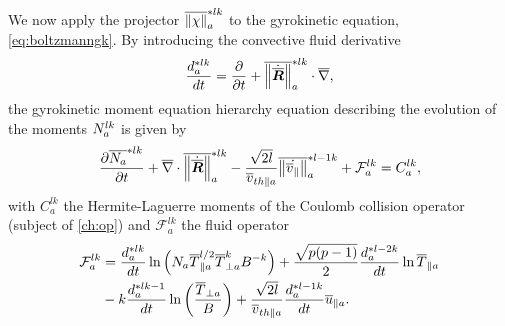 We now apply the projector ${\overline{\left\lVert\chi\right\rVert}^{*lk}_a}$ to the gyrokinetic equation, \cref{eq:boltzmanngk}.
By introducing the convective fluid derivative 
%
\begin{equation} \label{convectivederivative}
\frac{d_a^{*lk}}{d t} = \frac{\partial }{\partial t} + \overline{\left\lVert\dot {\overline{\bm{R}}}\right\rVert}^{*lk}_a \cdot \overline{\nabla},
\end{equation}
%
the gyrokinetic moment equation hierarchy equation describing the evolution of the moments $N_a^{lk}$ is given by
%
\begin{equation} \label{GyromomentHierarchyEquation}  
\frac{\partial \overline {N_a}^{*lk} }{\partial t }  + \overline{\nabla} \cdot \overline{\left\lVert\dot {\overline{\bm{R}}}\right\rVert}^{*lk}_a  - \frac{\sqrt{2l}}{ \overline{v}_{th\parallel a }}\overline{\left\lVert\dot {\overline{v}_{\parallel}}\right\rVert}^{*l-1k}_a + \mathcal{F}_a^{lk} = C_a^{lk},
\end{equation}
%
with $C_a^{lk}$ the Hermite-Laguerre moments of the Coulomb collision operator (subject of \cref{ch:op}) and $\mathcal{F}_{a}^{lk}$ the fluid operator
%
\begin{align} \label{fluidoperatoralk}
\mathcal{F}_{a}^{lk} & = \frac{d_a^{*lk}}{d t} \ln \left(N_a \overline{T}_{ \parallel a }^{l/2}  \overline{T}_{\perp a}^k B^{-k}\right)  + \frac{\sqrt{p(p-1)}}{2} \frac{d_a^{*l-2k}}{d t} \ln \overline{T}_{ \parallel a } \nonumber \\
 &  - k \frac{d_a^{*lk-1}}{d t} \ln \left(   \frac{\overline{T}_{\perp a}}{B} \right) + \frac{\sqrt{2l}}{\overline{v}_{th\parallel a }} \frac{d_a^{*l-1k}}{d t} \overline{u}_{\parallel a}.
\end{align}

